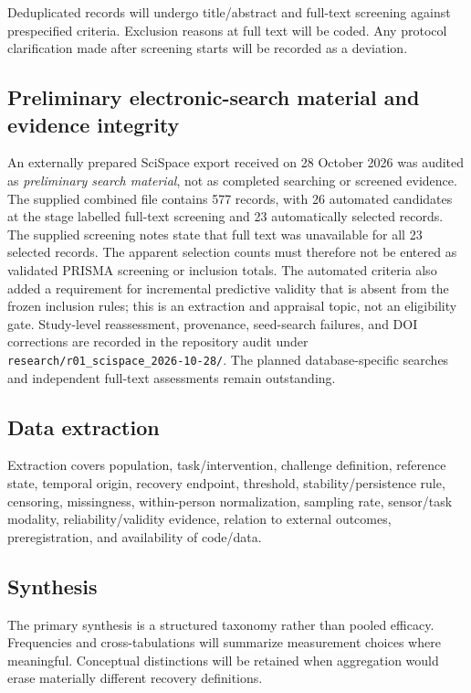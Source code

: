 Deduplicated records will undergo title/abstract and full-text screening against prespecified criteria. Exclusion reasons at full text will be coded. Any protocol clarification made after screening starts will be recorded as a deviation.

\subsection{Preliminary electronic-search material and evidence integrity}

An externally prepared SciSpace export received on 28 October 2026 was audited as \emph{preliminary search material}, not as completed searching or screened evidence. The supplied combined file contains 577 records, with 26 automated candidates at the stage labelled full-text screening and 23 automatically selected records. The supplied screening notes state that full text was unavailable for all 23 selected records. The apparent selection counts must therefore not be entered as validated PRISMA screening or inclusion totals. The automated criteria also added a requirement for incremental predictive validity that is absent from the frozen inclusion rules; this is an extraction and appraisal topic, not an eligibility gate. Study-level reassessment, provenance, seed-search failures, and DOI corrections are recorded in the repository audit under \texttt{research/r01\_scispace\_2026-10-28/}. The planned database-specific searches and independent full-text assessments remain outstanding.

\subsection{Data extraction}

Extraction covers population, task/intervention, challenge definition, reference state, temporal origin, recovery endpoint, threshold, stability/persistence rule, censoring, missingness, within-person normalization, sampling rate, sensor/task modality, reliability/validity evidence, relation to external outcomes, preregistration, and availability of code/data.

\subsection{Synthesis}

The primary synthesis is a structured taxonomy rather than pooled efficacy. Frequencies and cross-tabulations will summarize measurement choices where meaningful. Conceptual distinctions will be retained when aggregation would erase materially different recovery definitions.

